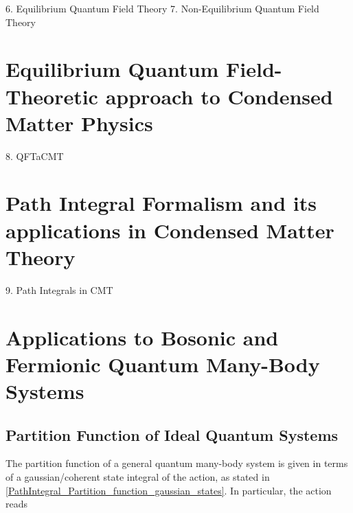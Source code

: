 \documentclass{homework}
\begin{document}
{6. Equilibrium Quantum Field Theory}
{7. Non-Equilibrium Quantum Field Theory}

\iffalse
\section{{\textbf{Equilibrium Quantum Field-Theoretic approach to Condensed Matter Physics}}}
{8. QFTaCMT}

\section{{\textbf{Path Integral Formalism and its applications in Condensed Matter Theory}}}
{9. Path Integrals in CMT}

\section{\textbf{Applications to Bosonic and Fermionic Quantum Many-Body Systems}}

\subsection{Partition Function of Ideal Quantum Systems}

The partition function of a general quantum many-body system is given in terms of a gaussian/coherent state integral of the action, as stated in  \cref{PathIntegral_Partition_function_gaussian_states}. In particular, the action reads 
\end{document}
